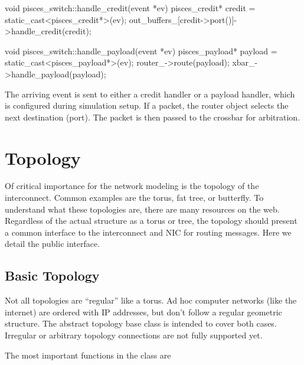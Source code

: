 \begin{CppCode}
void pisces_switch::handle_credit(event *ev)
{
  pisces_credit* credit = static_cast<pisces_credit*>(ev);
  out_buffers_[credit->port()]->handle_credit(credit);
}

void pisces_switch::handle_payload(event *ev)
{
  pisces_payload* payload = static_cast<pisces_payload*>(ev);
  router_->route(payload);
  xbar_->handle_payload(payload);
}
\end{CppCode}
The arriving event is sent to either a credit handler or a payload handler,
which is configured during simulation setup.
If a packet, the router object selects the next destination (port).
The packet is then passed to the crossbar for arbitration.

\section{Topology}
\label{sec:topology}
Of critical importance for the network modeling is the topology of the interconnect.
Common examples are the torus, fat tree, or butterfly.
To understand what these topologies are, there are many resources on the web.
Regardless of the actual structure as a torus or tree, the topology should present a common interface to the interconnect and NIC for routing messages.
Here we detail the public interface.

\subsection{Basic Topology}
\label{subsec:basicTopology}
Not all topologies are ``regular'' like a torus.  Ad hoc computer networks (like the internet) are ordered with IP addresses, but don't follow a regular geometric structure.
The abstract topology base class is intended to cover both cases.
Irregular or arbitrary topology connections are not fully supported yet.

The most important functions in the \topcls class are


